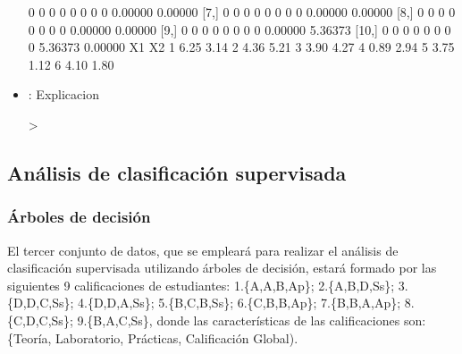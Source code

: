 \documentclass[a4paper, 12pt]{article}
\begin{document}
\begin{itemize}
\begin{Schunk}
\begin{Soutput}
 [6,]    0    0    0    0    0    0    0    0 0.00000 0.00000
 [7,]    0    0    0    0    0    0    0    0 0.00000 0.00000
 [8,]    0    0    0    0    0    0    0    0 0.00000 0.00000
 [9,]    0    0    0    0    0    0    0    0 0.00000 5.36373
[10,]    0    0    0    0    0    0    0    0 5.36373 0.00000
    X1   X2
1 6.25 3.14
2 4.36 5.21
3 3.90 4.27
4 0.89 2.94
5 3.75 1.12
6 4.10 1.80
\end{Soutput}
\end{Schunk}
		\item \texttt{}: 
		Explicacion
\begin{Schunk}
\begin{Sinput}
> 
\end{Sinput}
\end{Schunk}

	\end{itemize}

	\newpage

	\subsection{Análisis de clasificación supervisada}
	
	\subsubsection{Árboles de decisión}
	
	El tercer conjunto de datos, que se empleará para realizar el análisis de clasificación supervisada utilizando árboles de decisión, estará formado por las siguientes 9 calificaciones de estudiantes: 1.\{A,A,B,Ap\}; 2.\{A,B,D,Ss\}; 3.\{D,D,C,Ss\}; 4.\{D,D,A,Ss\}; 5.\{B,C,B,Ss\}; 6.\{C,B,B,Ap\}; 7.\{B,B,A,Ap\}; 8.\{C,D,C,Ss\}; 9.\{B,A,C,Ss\}, donde las características de las calificaciones son: \{Teoría, Laboratorio, Prácticas, Calificación Global).
\end{document}
